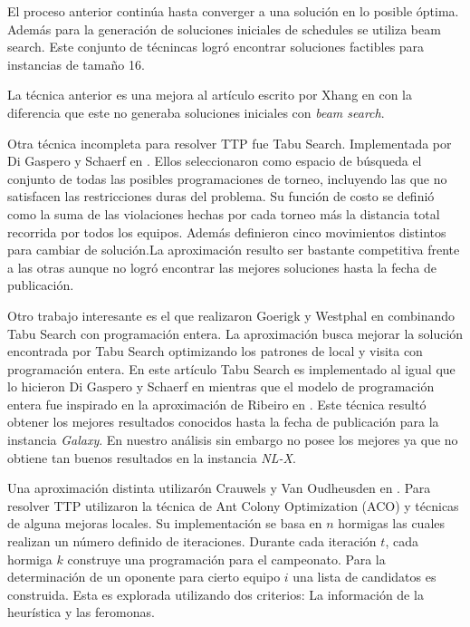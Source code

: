 \documentclass[letter, 10pt]{article}
\begin{document}
    El proceso anterior continúa hasta converger a una solución en lo posible óptima. Además para la generación de soluciones iniciales de schedules se utiliza beam search. Este conjunto de técnincas logró encontrar soluciones factibles para instancias de tamaño 16.
    
    La técnica anterior es una mejora al artículo escrito por Xhang en \cite{Hill-Climbing} con la diferencia que este no generaba soluciones iniciales con \emph{beam search}.
    
    Otra técnica incompleta para resolver TTP fue Tabu Search. Implementada por Di Gaspero y Schaerf en \cite{Tabu}. Ellos seleccionaron como espacio de búsqueda el conjunto de todas las posibles programaciones de torneo, incluyendo las que no satisfacen las restricciones duras del problema. Su función de costo se definió como la suma de las violaciones hechas por cada torneo más la distancia total recorrida por todos los equipos. Además definieron cinco movimientos distintos para cambiar de solución.La aproximación resulto ser bastante competitiva frente a las otras aunque no logró encontrar las mejores soluciones hasta la fecha de publicación. 
    
    Otro trabajo interesante es el que realizaron Goerigk y Westphal en \cite{combined} combinando Tabu Search con programación entera. La aproximación busca mejorar la solución encontrada por Tabu Search optimizando los patrones de local y visita con programación entera. En este artículo Tabu Search es implementado al igual que lo hicieron Di Gaspero y Schaerf en \cite{Tabu} mientras que el modelo de programación entera fue inspirado en la aproximación de Ribeiro en \cite{ribeiro2012sports}. Este técnica resultó obtener los mejores resultados conocidos hasta la fecha de publicación para la instancia \emph{Galaxy}. En nuestro análisis sin embargo no posee los mejores ya que no obtiene tan buenos resultados en la instancia \emph{NL-X}.
    
    Una aproximación distinta utilizarón Crauwels y Van Oudheusden en \cite{ant_viejo}. Para resolver TTP utilizaron la técnica de Ant Colony Optimization (ACO) y técnicas de alguna mejoras locales. Su implementación se basa en $n$ hormigas las cuales realizan un número definido de iteraciones. Durante cada iteración $t$, cada hormiga $k$ construye una programación para el campeonato. Para la determinación de un oponente para cierto equipo $i$ una lista de candidatos es construida. Esta es explorada utilizando dos criterios: La información de la heurística y las feromonas. 
    
\end{document}
